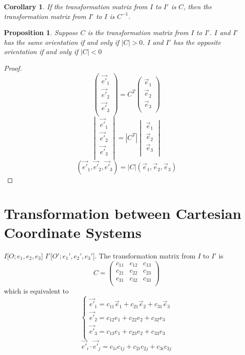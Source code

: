 \documentclass[onecolumn]{ctexart}
\newtheorem{proposition}{Proposition}
\newtheorem{corollary}{Corollary}
\begin{document}
\begin{corollary}
  If the transformation matrix from $I$ to $I'$ is $C$, then the transformation 
  matrix from $I'$ to $I$ is $C^{-1}$.
\end{corollary}

\begin{proposition}
  Suppose $C$ is the transformation matrix from $I$ to $I'$. $I$ and $I'$ has 
  the same orientation if and only if $|C| > 0$. $I$ and $I'$ has the opposite 
  orientation if and only if $|C| < 0$
\end{proposition}
\begin{proof}
  \[
    \begin{pmatrix}
      \vec{e'}_1 \\
      \vec{e'}_2 \\
      \vec{e'}_3 \\
    \end{pmatrix} = C^T 
    \begin{pmatrix}
      \vec{e}_1 \\
      \vec{e}_2 \\
      \vec{e}_3 \\
    \end{pmatrix}
  \]
  \[
    \begin{vmatrix}
      \vec{e'}_1 \\
      \vec{e'}_2 \\
      \vec{e'}_3 \\
    \end{vmatrix} = |C^T|
    \begin{vmatrix}
      \vec{e}_1 \\
      \vec{e}_2 \\
      \vec{e}_3 \\
    \end{vmatrix}
  \]
  \[
    (\vec{e'}_1, \vec{e'}_2, \vec{e'}_3) = |C| (\vec{e}_1, \vec{e}_2, \vec{e}_3)
  \]
\end{proof}

\section{Transformation between Cartesian Coordinate Systems}

$I \lbrack O; e_1, e_2, e_3 \rbrack$ $I' \lbrack O'; e_1', e_2', e_3' \rbrack$. The transformation matrix from $I$ to $I'$ is
\[
  C = 
  \begin{pmatrix}
    c_{11} & c_{12} & c_{13} \\
    c_{21} & c_{22} & c_{23} \\
    c_{31} & c_{32} & c_{33} \\
  \end{pmatrix}
\]
which is equivalent to
\[
  \begin{cases}
    \vec{e'}_1 = c_{11} \vec{e}_1 + c_{21} \vec{e}_2 + c_{31} \vec{e}_3 \\
    \vec{e'}_2 = c_{12} e_1 + c_{22} e_2 + c_{32} e_3 \\
    \vec{e'}_3 = c_{13} e_1 + c_{23} e_2 + c_{33} e_3 \\
  \end{cases}
\]
\[
  \vec{e'}_i \cdot \vec{e'}_j = c_{1i} c_{1j} + c_{2i} c_{2j} + c_{3i} c_{3j}
\]
\end{document}
